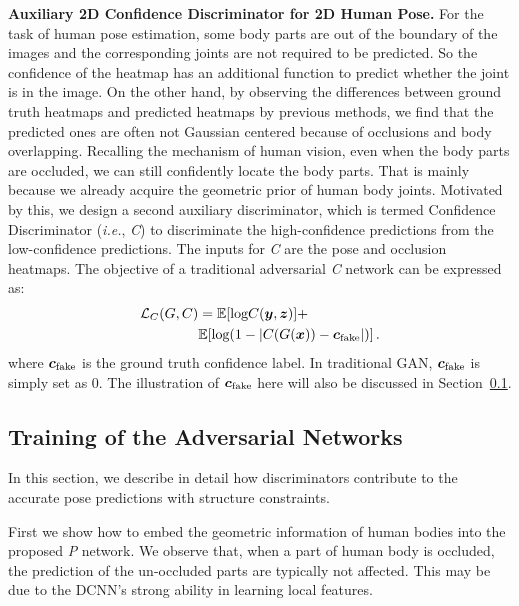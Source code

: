 \documentclass[10pt,journal,compsoc]{IEEEtran}
\begin{document}
\vspace{0.3em}
\noindent \textbf{Auxiliary 2D Confidence Discriminator for 2D Human Pose.}
For the task of human pose estimation, some body parts are out of the boundary of the images and the corresponding joints are not required to be predicted.
So the confidence of the heatmap has an additional function to predict whether the joint is in the image.
On the other hand, by observing the differences between ground truth heatmaps and predicted heatmaps by previous methods, we find that the predicted ones are often not Gaussian centered because of occlusions and body overlapping.
Recalling the mechanism of human vision, even when the body parts are occluded, we can still confidently locate the body parts.
That is mainly because we already acquire the geometric prior of human body joints.
Motivated by this, we design a second  auxiliary discriminator, which is termed Confidence Discriminator (\emph{i.e.}, \textit{C}) to discriminate the high-confidence predictions from the low-confidence predictions.
The inputs for \textit{C} are the pose and occlusion heatmaps.
The objective of a traditional adversarial \textit{C} network can be expressed as:
\begin{align}
\label{eq:disC}
\mathcal{L}_{C}(G,C)&=\mathbb{E}[\textrm{log}C(\bm{y},\bm{z})]+  \notag  \\
& \mathbb{E}[\textrm{log}(1-\vert C(G(\bm{x})) -\bm{c}_{\rm  fake} \vert)] \,.
\end{align}
where $\bm{c}_{\rm  fake}$ is the ground truth confidence label. In traditional GAN,  $\bm{c}_{\rm  fake}$ is simply set as 0. The illustration of $\bm{c}_{\rm  fake}$ here will also be discussed in Section~\ref{subsec:Geometric-Constrained-Training}.

\subsection{Training of the Adversarial Networks}\label{subsec:Geometric-Constrained-Training}

In this section, we describe in detail how discriminators contribute to the accurate pose predictions with structure constraints.

First we show how to embed the geometric information of human bodies into the proposed \textit{P} network.
We observe that, when a part of human body is occluded, the prediction of the un-occluded parts are typically not affected.
This may be due to the DCNN's strong ability in learning local features.
\end{document}
